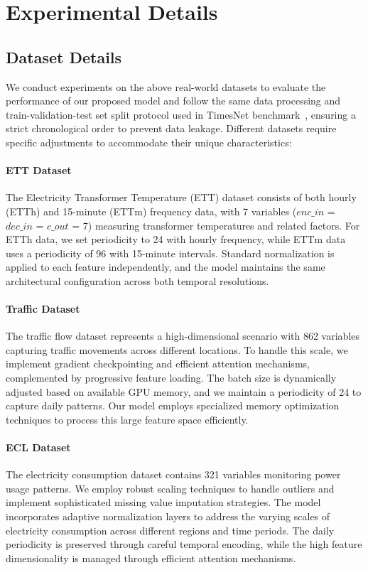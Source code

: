 \section{Experimental Details}
\subsection{Dataset Details}
\label{appx:dataset_details} 

We conduct experiments on the above real-world datasets to evaluate the performance of our proposed model and follow the same data processing and train-validation-test set split protocol used in TimesNet benchmark~\cite{wu2022timesnet}, ensuring a strict chronological order to prevent data leakage. Different datasets require specific adjustments to accommodate their unique characteristics:
\label{appx:dataset_configurations}

\paragraph{ETT Dataset~\cite{kim2021reversible}} The Electricity Transformer Temperature (ETT) dataset consists of both hourly (ETTh) and 15-minute (ETTm) frequency data, with 7 variables ($enc\_{in}$ = $dec\_{in}$ = $c\_{out}$ = 7) measuring transformer temperatures and related factors. For ETTh data, we set periodicity to 24 with hourly frequency, while ETTm data uses a periodicity of 96 with 15-minute intervals. Standard normalization is applied to each feature independently, and the model maintains the same architectural configuration across both temporal resolutions.

\paragraph{Traffic Dataset~\cite{wu2022timesnet}} The traffic flow dataset represents a high-dimensional scenario with 862 variables capturing traffic movements across different locations. To handle this scale, we implement gradient checkpointing and efficient attention mechanisms, complemented by progressive feature loading. The batch size is dynamically adjusted based on available GPU memory, and we maintain a periodicity of 24 to capture daily patterns. Our model employs specialized memory optimization techniques to process this large feature space efficiently.

\paragraph{ECL Dataset~\cite{wu2021autoformer}} The electricity consumption dataset contains 321 variables monitoring power usage patterns. We employ robust scaling techniques to handle outliers and implement sophisticated missing value imputation strategies. The model incorporates adaptive normalization layers to address the varying scales of electricity consumption across different regions and time periods. The daily periodicity is preserved through careful temporal encoding, while the high feature dimensionality is managed through efficient attention mechanisms.

